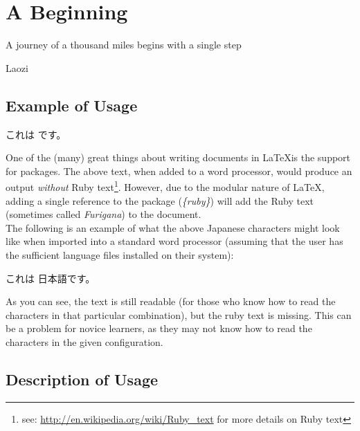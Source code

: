 \chapter{A Beginning}
\epigraph{A journey of a thousand miles begins with a single step}{Laozi}




\section{Example of Usage}
\begin{CJK}{UTF8}{min}
これは  です。\\
\end{CJK}
\indent{}One of the (many) great things about writing documents in \LaTeX is the support for packages.
The above text, when added to a word processor, would produce an output \emph{without} Ruby
text\footnote{see: \url{http://en.wikipedia.org/wiki/Ruby_text} for more details on Ruby text}.
However, due to the modular nature of \LaTeX, adding a single reference to the  package
(\emph{\{ruby\}}) will add the Ruby text (sometimes called \emph{Furigana}) to the document.\\
\indent{}The following
is an example of what the above Japanese characters might look like when imported into a standard
word processor (assuming that the user has the sufficient language files installed on their system):\\
\begin{CJK}{UTF8}{min}
\indent{}これは 日本語です。\\
\end{CJK}
\indent{}As you can see, the text is still readable (for those who know how to read the characters in
that particular combination), but the ruby text is missing. This can be a problem for novice learners, as
they may not know how to read the characters in the given configuration.
\section{Description of Usage}